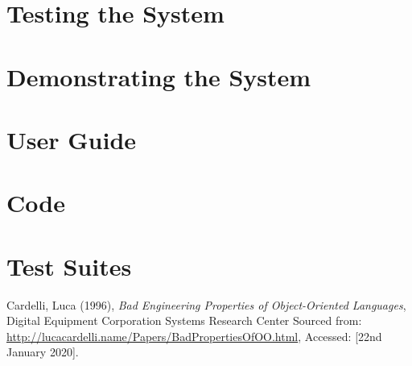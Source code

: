 \documentclass[12pt]{article}
\begin{document}
  \section{Testing the System}
  \section{Demonstrating the System}

  \appendix
  \section{User Guide}
  \section{Code}
  \section{Test Suites}

  \begin{thebibliography}{9}
    Cardelli, Luca (1996),
    \textit{Bad Engineering Properties of Object-Oriented Languages},
    Digital Equipment Corporation Systems Research Center
    Sourced from: \url{http://lucacardelli.name/Papers/BadPropertiesOfOO.html},
    Accessed: [22nd January 2020].

  \end{thebibliography}
\end{document}
